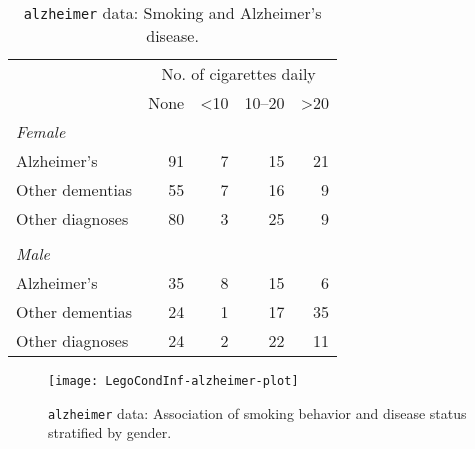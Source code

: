 \documentclass{article}
\newcommand{\Robject}[1]{\texttt{#1}}
\begin{document}
\begin{table}[h]
\begin{center}
\caption{\Robject{alzheimer} data: Smoking and Alzheimer's disease. \label{alzheimertab}}
\begin{tabular}{lrrrr} \hline \hline
 & \multicolumn{4}{c}{No. of cigarettes daily} \\
 & None & <10 & 10--20 & >20 \\ \hline
\textit{Female} & & & & \\
Alzheimer's  &  91 & 7 & 15 & 21 \\ 
Other dementias  &  55 & 7 & 16 & 9 \\ 
Other diagnoses  &  80 & 3 & 25 & 9 \\ 
& & & & \\
\textit{Male} & & & & \\
Alzheimer's  &  35 & 8 & 15 & 6 \\ 
Other dementias  &  24 & 1 & 17 & 35 \\ 
Other diagnoses  &  24 & 2 & 22 & 11 \\ \hline
\end{tabular}
\end{center}
\end{table}

\begin{sidewaysfigure}
\begin{center}
\texttt{[image: LegoCondInf-alzheimer-plot]}
\caption{\Robject{alzheimer} data: Association of
smoking behavior and disease status stratified by gender. \label{alz-plot}}
\end{center}
\end{sidewaysfigure}
\end{document}
